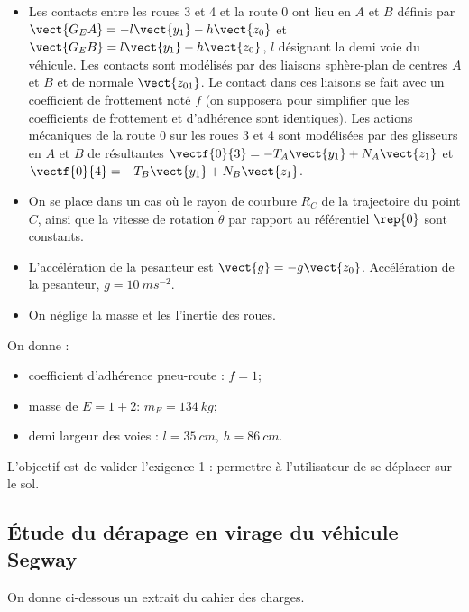 \begin{hypo}
\begin{itemize} 
\item Les contacts entre les roues 3 et 4 et la route 0 ont lieu en $A$ et $B$ définis par $\vect{G_EA}=-l\vect{y_1}-h\vect{z_0}$ et $\vect{G_EB}=l\vect{y_1}-h\vect{z_0}$, $l$ désignant la demi voie du véhicule. Les contacts sont modélisés par des liaisons sphère-plan de centres $A$ et $B$ et de normale $\vect{z_{01}}$. Le contact dans ces liaisons se fait avec un coefficient de frottement noté $f$ (on supposera pour simplifier que les coefficients de frottement et d'adhérence sont identiques). Les actions mécaniques de la route 0 sur les roues 3 et 4 sont modélisées par des glisseurs en $A$ et $B$ de résultantes $\vectf{0}{3}=-T_A\vect{y_1}+N_A\vect{z_1}$ et $\vectf{0}{4}=-T_B\vect{y_1}+N_B\vect{z_1}$.
\item On se place dans un cas où le rayon de courbure $R_C$ de la trajectoire du point $C$, ainsi que la vitesse de rotation $\dot{\theta}$ par rapport au référentiel $\rep{0}$ sont constants.
\item L'accélération de la pesanteur est $\vect{g}=-g\vect{z_0}$. Accélération de la pesanteur, $g=\SI{10}{ms^{-2}}$.
\item On néglige la masse et les l'inertie des roues. 
\end{itemize}
\end{hypo}
On donne : 	
\begin{itemize}
\item coefficient d'adhérence pneu-route :  $f=1$;
\item masse de $E=1+2$:  $m_E=\SI{134}{kg}$;
\item demi largeur des voies :  $l=\SI{35}{cm}$,  $h=\SI{86}{cm}$.
\end{itemize}
\fi

\begin{obj}
L'objectif est de valider l'exigence 1 : permettre à l'utilisateur de se déplacer sur le sol.
\end{obj}

\subsection*{Étude du dérapage en virage du véhicule Segway}
\ifprof

\else
On donne ci-dessous un extrait du cahier des charges.

